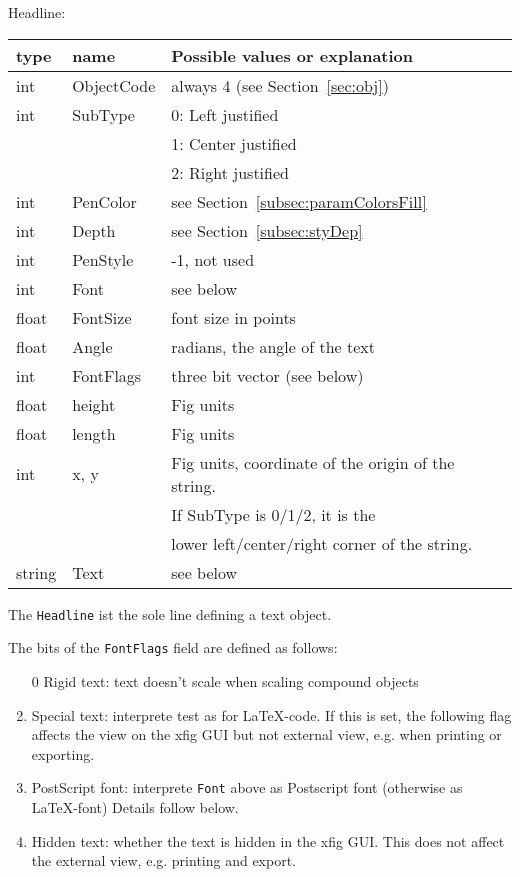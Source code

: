 \documentclass[10pt, a4paper]{article}
\begin{document}
\noindent
Headline: \\
%
\begin{tabular}{|lll|}
\hline
type   & name       & Possible values or explanation \\
\hline
\hline
int    & ObjectCode & always 4 (see Section~\ref{sec:obj}) \\
int    & SubType    & 0: Left justified \\ %
&&                    1: Center justified \\
&&                    2: Right justified \\
int    & PenColor   & see Section~\ref{subsec:paramColorsFill} \\
int    & Depth      & see Section~\ref{subsec:styDep} \\
int    & PenStyle   & -1, not used \\
int    & Font       & see below \\
float  & FontSize   & font size in points \\
float  & Angle      & radians, the angle of the text \\
int    & FontFlags  & three bit vector (see below) \\
float  & height     & Fig units \\
float  & length     & Fig units \\
int    & x, y       & Fig units, coordinate of the origin of the string.  \\
&&                    If SubType is 0/1/2, it is the \\
&&                    lower left/center/right corner of the string.\\
string & Text       & see below \\
\hline
\end{tabular}

The {\tt Headline} ist the sole line defining a text object. 

\noindent
The bits of the {\tt FontFlags} field are defined as follows:
%
\begin{enumerate}
\item[0]
Rigid text: text doesn't scale when scaling compound objects
\item
Special text: interprete test as for \LaTeX-code. 
If this is set, the following flag affects the view on the xfig GUI 
but not external view, e.g. when printing or exporting. 
\item
PostScript font: interprete {\tt Font} above 
as Postscript font (otherwise as \LaTeX{}-font) 
Details follow below. 
\item
Hidden text: whether the text is hidden in the xfig GUI. 
This does not affect the external view, e.g. printing and export. 
\end{enumerate}
\end{document}
